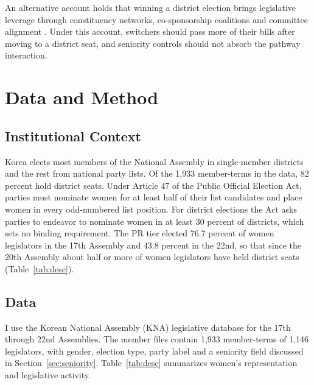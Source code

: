 \documentclass[11pt]{article}
\begin{document}
An alternative account holds that winning a district election brings legislative leverage through constituency networks, co-sponsorship coalitions and committee alignment \citep{carey1995, an2025}. Under this account, switchers should pass more of their bills after moving to a district seat, and seniority controls should not absorb the pathway interaction.


\section{Data and Method}

\subsection{Institutional Context}
\label{sec:context}

Korea elects most members of the National Assembly in single-member districts and the rest from national party lists. Of the 1,933 member-terms in the data, 82 percent hold district seats. Under Article 47 of the Public Official Election Act, parties must nominate women for at least half of their list candidates and place women in every odd-numbered list position. For district elections the Act asks parties to endeavor to nominate women in at least 30 percent of districts, which sets no binding requirement. The PR tier elected 76.7 percent of women legislators in the 17th Assembly and 43.8 percent in the 22nd, so that since the 20th Assembly about half or more of women legislators have held district seats (Table~\ref{tab:desc}).

\subsection{Data}

I use the Korean National Assembly (KNA) legislative database for the 17th through 22nd Assemblies. The member files contain 1,933 member-terms of 1,146 legislators, with gender, election type, party label and a seniority field discussed in Section~\ref{sec:seniority}. Table~\ref{tab:desc} summarizes women's representation and legislative activity.
\end{document}
